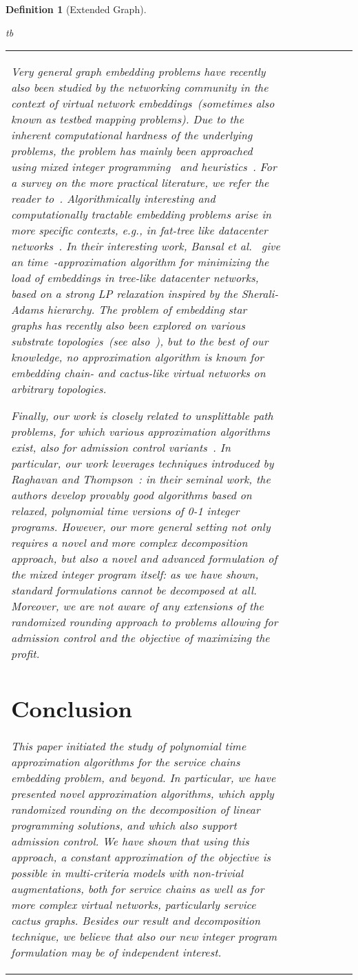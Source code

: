 \documentclass[10pt, conference, letterpaper]{IEEEtran}
\newtheorem{definition}[theorem]{Definition}
\begin{document}
\begin{definition}[Extended Graph]
{\begin{IPFormulation}{tb}
{\begin{tabular}{FFCLLBB}
Very general graph embedding problems have recently also 
been studied by the networking community
in the context of virtual network embeddings~(sometimes
also known as testbed mapping problems).
Due to the inherent computational hardness of the underlying
problems, the problem has mainly been approached using mixed integer
programming~\cite{vnep} and heuristics~\cite{vnep-rethink}.
For a survey on the more practical literature, we refer
the reader to~\cite{vnep-survey}.
Algorithmically interesting and computationally tractable embedding problems
arise in more specific contexts, e.g., 
in fat-tree like datacenter networks~\cite{oktopus,ccr15emb}.
In their interesting work, 
Bansal et al.~\cite{bansal2011minimum} 
give an
 time~-approximation algorithm 
for minimizing the load of embeddings in tree-like datacenter
networks, based on a strong LP relaxation
inspired by the Sherali-Adams hierarchy.
The problem of embedding star graphs 
has recently also been explored on various substrate topologies~(see also~\cite{ccr15emb}),
but to the best of our knowledge, no approximation algorithm
is known for embedding chain- and cactus-like virtual networks on arbitrary topologies.


Finally, our work is closely related to unsplittable
path problems, for which various approximation algorithms
exist,
also for admission control variants~\cite{Kleinberg-admission-control}.
In particular, our work leverages  
techniques introduced by Raghavan and Thompson~\cite{Raghavan-Thompson}:
in their seminal work, the authors 
develop provably
good algorithms based on relaxed, polynomial time versions of 
0-1 integer programs. 
However, our more general setting not only requires a novel
and more complex decomposition approach,   but also a novel and advanced
formulation of the mixed integer program itself: as we have shown, 
standard formulations cannot be decomposed at all.
Moreover, we are not aware of any extensions of the randomized rounding
approach to problems allowing for admission control and the objective of maximizing the profit. 



\section{Conclusion}\label{sec:conclusion}

This paper initiated the study of 
polynomial time approximation algorithms
for the service chains embedding problem, and beyond. 
In particular, we have presented novel approximation algorithms,
which apply randomized rounding on the decomposition of linear programming solutions, and which also support admission control. 
We have shown that using this approach, a constant approximation of the objective
is possible in multi-criteria models with non-trivial augmentations, both for
service chains as well as for more complex virtual networks, particularly
service cactus graphs.
Besides our result and decomposition technique,
we believe that also our new integer program formulation may be of independent interest.


\end{tabular}}
\end{IPFormulation}}
\end{definition}
\end{document}
